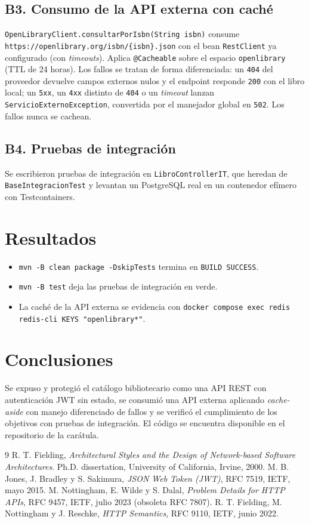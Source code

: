 \documentclass[11pt,a4paper]{article}
\begin{document}
\subsection{B3. Consumo de la API externa con caché}
\texttt{OpenLibraryClient.consultarPorIsbn(String isbn)} consume
\texttt{https://openlibrary.org/isbn/\{isbn\}.json} con el bean
\texttt{RestClient} ya configurado (con \emph{timeouts}). Aplica
\texttt{@Cacheable} sobre el espacio \texttt{openlibrary} (TTL de 24 horas).
Los fallos se tratan de forma diferenciada: un \texttt{404} del proveedor
devuelve campos externos nulos y el endpoint responde \texttt{200} con el libro
local; un \texttt{5xx}, un \texttt{4xx} distinto de \texttt{404} o un
\emph{timeout} lanzan \texttt{ServicioExternoException}, convertida por el
manejador global en \texttt{502}. Los fallos nunca se cachean.

\subsection{B4. Pruebas de integración}
Se escribieron pruebas de integración en \texttt{LibroControllerIT}, que
heredan de \texttt{BaseIntegracionTest} y levantan un PostgreSQL real en un
contenedor efímero con Testcontainers.

\section{Resultados}
\begin{itemize}
  \item \texttt{mvn -B clean package -DskipTests} termina en \texttt{BUILD SUCCESS}.
  \item \texttt{mvn -B test} deja las pruebas de integración en verde.
  \item La caché de la API externa se evidencia con
    \texttt{docker compose exec redis redis-cli KEYS "openlibrary*"}.
\end{itemize}

\section{Conclusiones}
Se expuso y protegió el catálogo bibliotecario como una API REST con
autenticación JWT sin estado, se consumió una API externa aplicando
\emph{cache-aside} con manejo diferenciado de fallos y se verificó el
cumplimiento de los objetivos con pruebas de integración. El código se
encuentra disponible en el repositorio de la carátula.

\begin{thebibliography}{9}
 R. T. Fielding, \emph{Architectural Styles and the Design of
  Network-based Software Architectures}. Ph.D. dissertation, University of
  California, Irvine, 2000.
 M. B. Jones, J. Bradley y S. Sakimura, \emph{JSON Web Token
  (JWT)}, RFC 7519, IETF, mayo 2015.
 M. Nottingham, E. Wilde y S. Dalal, \emph{Problem Details for
  HTTP APIs}, RFC 9457, IETF, julio 2023 (obsoleta RFC 7807).
 R. T. Fielding, M. Nottingham y J. Reschke, \emph{HTTP
  Semantics}, RFC 9110, IETF, junio 2022.
\end{thebibliography}
\end{document}
